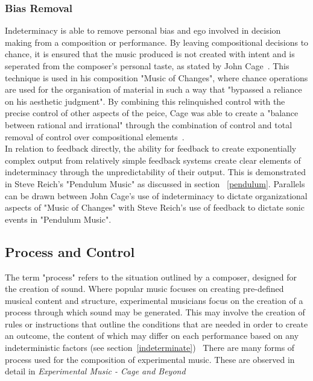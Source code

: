 \documentclass[titlepage]{scrartcl}
\begin{document}
    \subsubsection{Bias Removal}
    Indeterminacy is able to remove personal bias and ego involved in decision
    making from a composition or performance. By leaving compositional
    decisions to chance, it is ensured that the music produced is not created
    with intent and is seperated from the composer's personal taste, as stated
    by John Cage~\parencite[p.381]{holmes2012eaem}. This technique is used in
    his composition "Music of Changes", where chance operations are used for
    the organisation of material in such a way that "bypassed a reliance on his
    aesthetic judgment". By combining this relinquished control with the
    precise control of other aspects of the peice, Cage was able to create a
    "balance between rational and irrational" through the combination of
    control and total removal of control over compositional
    elements~\parencite[p.97-98]{jc2009co}.\\
    In relation to feedback directly, the ability for feedback to create
    exponentially complex output from relatively simple feedback systems
    create clear elements of indeterminacy through the unpredictability of
    their output. This is demonstrated in Steve Reich's "Pendulum Music" as
    discussed in section ~\ref{pendulum}. Parallels can be drawn between John
    Cage's use of indeterminacy to dictate organizational aspects of "Music of
    Changes" with Steve Reich's use of feedback to dictate sonic events in
    "Pendulum Music".
    
    \subsection{Process and Control}
    The term "process" refers to the situation outlined by a composer, designed
    for the creation of sound. Where popular music focuses on creating pre-defined
    musical content and structure, experimental musicians focus on the creation
    of a process through which sound may be generated. This may involve the
    creation of rules or instructions that outline the conditions that are
    needed in order to create an outcome, the content of which may differ on
    each performance based on any indeterministic factors (see
    section~\ref{indeterminate})~\parencite[p.4]{nyman1999em}
    There are many forms of process used for the composition of experimental
    music. These are observed in detail in \textit{Experimental Music - Cage
    and Beyond}~\parencite[p.4-14]{nyman1999em}
\end{document}
